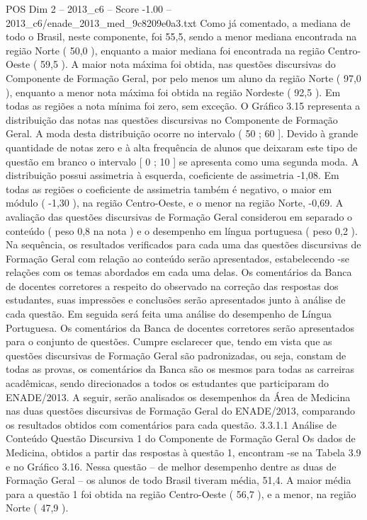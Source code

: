 \begin{textsample}{POS Dim 2 – 2013\_c6 – Score -1.00 – 2013\_c6/enade\_2013\_med\_9c8209e0a3.txt}
Como já comentado, a mediana de todo o Brasil, neste componente, foi 55,5, sendo a menor mediana encontrada na região Norte ( 50,0 ), enquanto a maior mediana foi encontrada na região Centro-Oeste ( 59,5 ).
A maior nota máxima foi obtida, nas questões discursivas do Componente de Formação Geral, por pelo menos um aluno da região Norte ( 97,0 ), enquanto a menor nota máxima foi obtida na região Nordeste ( 92,5 ).
Em todas as regiões a nota mínima foi zero, sem exceção.
O Gráfico 3.15 representa a distribuição das notas nas questões discursivas no Componente de Formação Geral.
A moda desta distribuição ocorre no intervalo ( 50 ; 60 ].
Devido à grande quantidade de notas zero e à alta frequência de alunos que deixaram este tipo de questão em branco o intervalo [ 0 ; 10 ] se apresenta como uma segunda moda.
A distribuição possui assimetria à esquerda, coeficiente de assimetria -1,08.
Em todas as regiões o coeficiente de assimetria também é negativo, o maior em módulo ( -1,30 ), na região Centro-Oeste, e o menor na região Norte, -0,69.
A avaliação das questões discursivas de Formação Geral considerou em separado o conteúdo ( peso 0,8 na nota ) e o desempenho em língua portuguesa ( peso 0,2 ).
Na sequência, os resultados verificados para cada uma das questões discursivas de Formação Geral com relação ao conteúdo serão apresentados, estabelecendo -se relações com os temas abordados em cada uma delas.
Os comentários da Banca de docentes corretores a respeito do observado na correção das respostas dos estudantes, suas impressões e conclusões serão apresentados junto à análise de cada questão.
Em seguida será feita uma análise do desempenho de Língua Portuguesa.
Os comentários da Banca de docentes corretores serão apresentados para o conjunto de questões.
Cumpre esclarecer que, tendo em vista que as questões discursivas de Formação Geral são padronizadas, ou seja, constam de todas as provas, os comentários da Banca são os mesmos para todas as carreiras acadêmicas, sendo direcionados a todos os estudantes que participaram do ENADE/2013.
A seguir, serão analisados os desempenhos da Área de Medicina nas duas questões discursivas de Formação Geral do ENADE/2013, comparando os resultados obtidos com comentários para cada questão. 3.3.1.1 Análise de Conteúdo Questão Discursiva 1 do Componente de Formação Geral Os dados de Medicina, obtidos a partir das respostas à questão 1, encontram -se na Tabela 3.9 e no Gráfico 3.16.
Nessa questão – de melhor desempenho dentre as duas de Formação Geral – os alunos de todo Brasil tiveram média, 51,4.
A maior média para a questão 1 foi obtida na região Centro-Oeste ( 56,7 ), e a menor, na região Norte ( 47,9 ).

\end{textsample}

